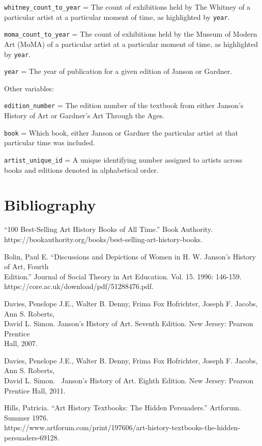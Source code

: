\documentclass[
  letterpaper,
  DIV=11,
  numbers=noendperiod]{scrreprt}
\begin{document}
\texttt{whitney\_count\_to\_year} = The count of exhibitions held by The
Whitney of a particular artist at a particular moment of time, as
highlighted by \texttt{year}.

\texttt{moma\_count\_to\_year} = The count of exhibitions held by the
Museum of Modern Art (MoMA) of a particular artist at a particular
moment of time, as highlighted by \texttt{year}.

\texttt{year} = The year of publication for a given edition of Janson or
Gardner.

Other variables:

\texttt{edition\_number} = The edition number of the textbook from
either Janson's History of Art or Gardner's Art Through the Ages.

\texttt{book} = Which book, either Janson or Gardner the particular
artist at that particular time was included.

\texttt{artist\_unique\_id} = A unique identifying number assigned to
artists across books and editions denoted in alphabetical order.

\hypertarget{bibliography}{%
\chapter{Bibliography}\label{bibliography}}

``100 Best-Selling Art History Books of All Time.'' Book Authority.\\
https://bookauthority.org/books/best-selling-art-history-books.~~

Bolin, Paul E. ``Discussions and Depictions of Women in H. W. Janson's
History of Art, Fourth\\
Edition.'' Journal of Social Theory in Art Education. Vol. 15. 1996:
146-159.\\
https://core.ac.uk/download/pdf/51288476.pdf.

Davies, Penelope J.E., Walter B. Denny, Frima Fox Hofrichter, Joseph F.
Jacobs, Ann S. Roberts,\\
David L. Simon. Janson's History of Art. Seventh Edition. New Jersey:
Pearson Prentice\\
Hall, 2007.

Davies, Penelope J.E., Walter B. Denny, Frima Fox Hofrichter, Joseph F.
Jacobs, Ann S. Roberts,\\
David L. Simon.~ Janson's History of Art. Eighth Edition. New Jersey:
Pearson\\
Prentice Hall, 2011.

Hills, Patricia. ``Art History Textbooks: The Hidden Persuaders.''
Artforum. Summer 1976.\\
https://www.artforum.com/print/197606/art-history-textbooks-the-hidden-\\
persuaders-69128.~
\end{document}
